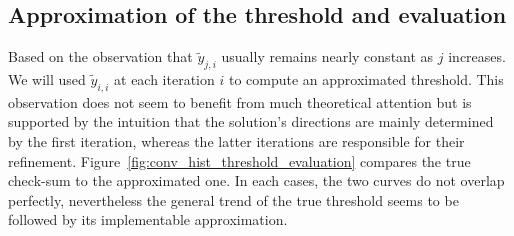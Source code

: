 \subsection{Approximation of the threshold and evaluation}\label{sec:threshold}
Based on the observation that $\widetilde{y}_{j, i}$ usually remains nearly constant as $j$ increases. We will used $\widetilde{y}_{i, i}$ at each iteration $i$ to compute an approximated threshold. This observation does not seem to benefit from much theoretical attention but is supported by the intuition that the solution's directions are mainly determined by the first iteration, whereas the latter iterations are responsible for their refinement. Figure~\ref{fig:conv_hist_threshold_evaluation} compares the true check-sum to the approximated one. In each cases, the two curves do not overlap perfectly, nevertheless the general trend of the true threshold seems to be followed by its implementable approximation.



